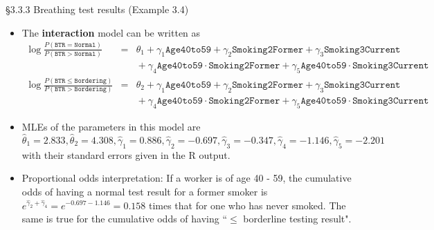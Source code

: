 \documentclass{beamer}
\begin{document}
\begin{frame}{\S3.3.3 Breathing test results  (Example 3.4)}
\begin{itemize}
\item
The {\bf interaction} model can be written as {\scriptsize
\begin{eqnarray*}
\log\frac{P(\texttt{BTR}=\texttt{Normal})}{P(\texttt{BTR}>\texttt{Normal})}\!\!&\!\!\!\!=\!\!\!&\!\!\!\theta_1
+ \gamma_1\texttt{Age40to59}+\gamma_2\texttt{Smoking2Former}+\gamma_3\texttt{Smoking3Current} \\
\!\!\!\!&\!\!\!\! &\!\!\!\!\!\!\!\!\!\!\!\!\!\!\!\!+ \gamma_4\texttt{Age40to59}\cdot \texttt{Smoking2Former}
+ \gamma_5\texttt{Age40to59}\cdot \texttt{Smoking3Current} \\
\log\frac{P(\texttt{BTR}\leq \texttt{Bordering})}{P(\texttt{BTR}>\texttt{Bordering})}\!\!&\!\!\!\!=\!\!\!&\!\!\!\theta_2
+ \gamma_1\texttt{Age40to59}+\gamma_2\texttt{Smoking2Former}+\gamma_3\texttt{Smoking3Current} \\
\!\!\!\!&\!\!\!\! &\!\!\!\!\!\!\!\!\!\!\!\!\!\!\!\! + \gamma_4\texttt{Age40to59}\cdot \texttt{Smoking2Former}
+ \gamma_5\texttt{Age40to59}\cdot \texttt{Smoking3Current} 
\end{eqnarray*}}
\item
MLEs of the parameters in this  model are {\scriptsize
$$\hat{\theta}_1=2.833, \hat{\theta}_2=4.308, \hat{\gamma}_1=0.886, \hat{\gamma}_2=-0.697,
\hat{\gamma}_3=-0.347, \hat{\gamma}_4=-1.146, \hat{\gamma}_5=-2.201$$}
with their standard errors given in the R output.
\item
Proportional odds interpretation: If a worker is of age 40 - 59, the cumulative odds of having a normal test result for a former smoker is $e^{ \hat{\gamma}_2 + \hat{\gamma}_4} = e^{- 0.697 - 1.146} =0.158$  times that for one who has never smoked. The same is true for the cumulative odds of having ``$\leq$ borderline testing result". 

\end{itemize}
\end{frame}
\end{document}
